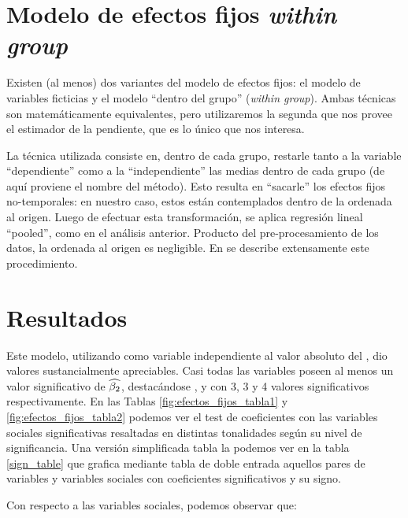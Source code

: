 \section{Modelo de efectos fijos \emph{within group}}

Existen (al menos) dos variantes del modelo de efectos fijos: el modelo de variables ficticias y el modelo ``dentro del grupo'' (\emph{within group}). Ambas técnicas son matemáticamente equivalentes, pero utilizaremos la segunda que nos provee el estimador de la pendiente, que es lo único que nos interesa.

La técnica utilizada consiste en, dentro de cada grupo, restarle tanto a la variable ``dependiente'' como a la ``independiente'' las medias dentro de cada grupo (de aquí proviene el nombre del método). Esto resulta en ``sacarle'' los efectos fijos no-temporales: en nuestro caso, estos están contemplados dentro de la ordenada al origen. Luego de efectuar esta transformación, se aplica regresión lineal ``pooled'', como en el análisis anterior. Producto del pre-procesamiento de los datos, la ordenada al origen es negligible. En \cite[chap 16]{gujarati1999} se describe extensamente este procedimiento.


\section{Resultados}


Este modelo, utilizando como variable independiente al valor absoluto del \entrainment, dio valores sustancialmente apreciables. Casi todas las variables \ap poseen al menos un valor significativo de $\widehat{\beta_2}$, destacándose \ENGMEAN, \NOISETOHARMONICS y \FOMEAN  con 3, 3 y 4 valores significativos respectivamente. En las Tablas \ref{fig:efectos_fijos_tabla1} y \ref{fig:efectos_fijos_tabla2} podemos ver el test de coeficientes con las variables sociales significativas resaltadas en distintas tonalidades según su nivel de significancia. Una versión simplificada tabla la podemos ver en la tabla \ref{sign_table} que grafica mediante tabla de doble entrada aquellos pares de variables \ap y variables sociales con coeficientes significativos y su signo.

Con respecto a las variables sociales, podemos observar que:

